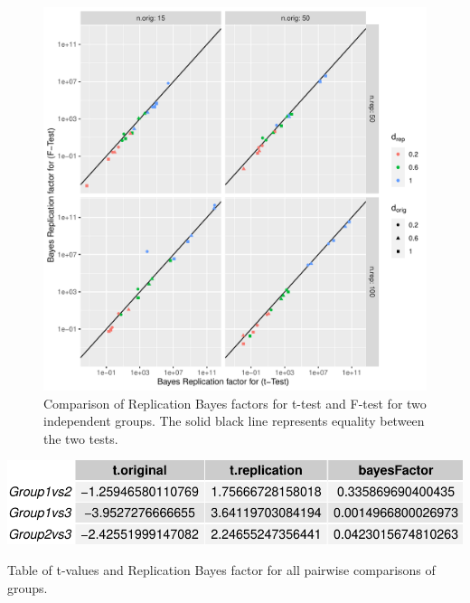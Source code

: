 \documentclass[11pt]{article}
\begin{document}
\begin{figure}[H]
    \centering
        \includegraphics[scale=.9]{figures/Group_9_Figure_2.pdf}
    \caption{Comparison of Replication Bayes factors for t-test and F-test for two independent groups. The solid black line represents equality between the two tests.}
    \label{fig:2}
\end{figure}
\begin{table}[H]
    \centering
        \includegraphics[scale=.8]{figures/Group_9_Table_1_cropped.pdf}
    \caption{Table of t-values and Replication Bayes factor for all pairwise comparisons of groups.}
    \label{table:1}
\end{table}
\end{document}
